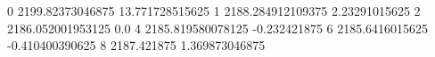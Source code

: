 0 2199.82373046875 13.771728515625
1 2188.284912109375 2.23291015625
2 2186.052001953125 0.0
4 2185.819580078125 -0.232421875
6 2185.6416015625 -0.410400390625
8 2187.421875 1.369873046875
